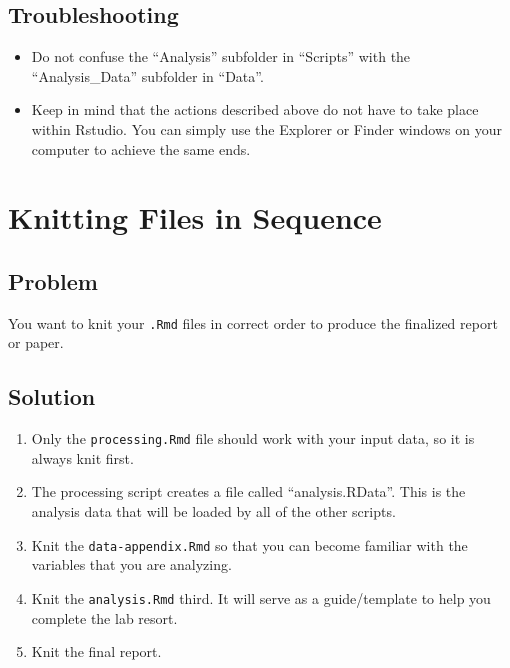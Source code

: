 \documentclass[
]{book}
\providecommand{\tightlist}{%
  \setlength{\itemsep}{0pt}\setlength{\parskip}{0pt}}
\begin{document}
\hypertarget{troubleshooting-10}{%
\subsection{Troubleshooting}\label{troubleshooting-10}}

\begin{itemize}
\tightlist
\item
  Do not confuse the ``Analysis'' subfolder in ``Scripts'' with the ``Analysis\_Data'' subfolder in ``Data''.
\item
  Keep in mind that the actions described above do not have to take place within Rstudio. You can simply use the Explorer or Finder windows on your computer to achieve the same ends.
\end{itemize}

\hypertarget{sequence}{%
\section{Knitting Files in Sequence}\label{sequence}}

\hypertarget{problem-13}{%
\subsection{Problem}\label{problem-13}}

You want to knit your \texttt{.Rmd} files in correct order to produce the finalized report or paper.

\hypertarget{solution-13}{%
\subsection{Solution}\label{solution-13}}

\begin{enumerate}
\def\labelenumi{\arabic{enumi}.}
\item
  Only the \texttt{processing.Rmd} file should work with your input data, so it is always knit first.
\item
  The processing script creates a file called ``analysis.RData''. This is the analysis data that will be loaded by all of the other scripts.
\item
  Knit the \texttt{data-appendix.Rmd} so that you can become familiar with the variables that you are analyzing.
\item
  Knit the \texttt{analysis.Rmd} third. It will serve as a guide/template to help you complete the lab resort.
\item
  Knit the final report.
\end{enumerate}
\end{document}
